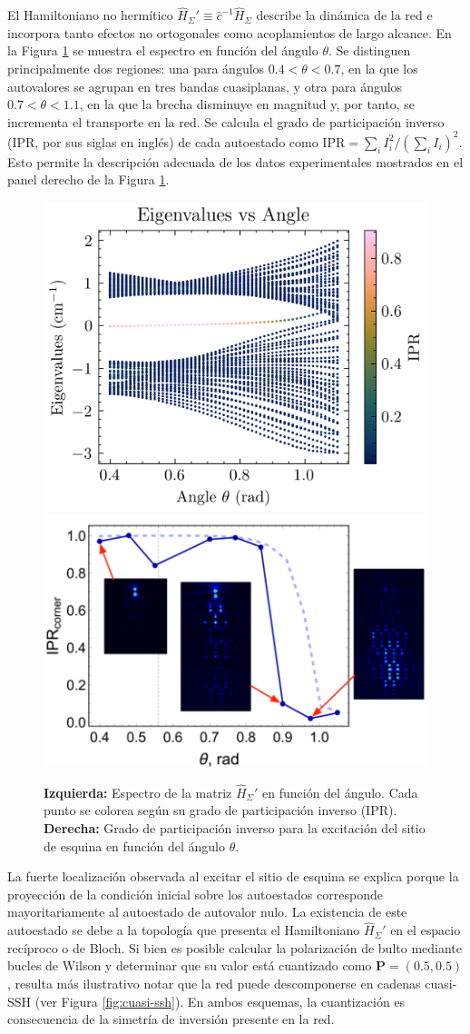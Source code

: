 El Hamiltoniano no hermítico $\hat{H}_\Sigma' \equiv \hat{c}^{-1} \hat{H}_\Sigma$ describe la dinámica de la red e incorpora tanto efectos no ortogonales como acoplamientos de largo alcance. En la Figura \ref{fig:honeycomb-spectra} se muestra el espectro en función del ángulo $\theta$. Se distinguen principalmente dos regiones: una para ángulos $0.4 < \theta < 0.7$, en la que los autovalores se agrupan en tres bandas cuasiplanas, y otra para ángulos $0.7 < \theta < 1.1$, en la que la brecha disminuye en magnitud y, por tanto, se incrementa el transporte en la red. Se calcula el grado de participación inverso (IPR, por sus siglas en inglés) de cada autoestado como $\text{IPR} = \sum_i I_i^2/(\sum_i I_i)^2$. Esto permite la descripción adecuada de los datos experimentales mostrados en el panel derecho de la Figura \ref{fig:honeycomb-spectra}.
\begin{figure}[H]
	\centering
	\includegraphics[width=0.45\linewidth]{codigo/honeycomb_eigenvalues_vs_angle.png}
	\includegraphics[width=0.5\linewidth]{media/ipr-corner-exp.png}
	\caption[Espectro de la red de panal de abeja de modos $p_y$ en función del ángulo]{\textbf{Izquierda:} Espectro de la matriz $\hat{H}_\Sigma'$ en función del ángulo. Cada punto se colorea según su grado de participación inverso (IPR). \textbf{Derecha:} Grado de participación inverso para la excitación del sitio de esquina en función del ángulo $\theta$.\label{fig:honeycomb-spectra}}
\end{figure} \vspace{-3ex}
La fuerte localización observada al excitar el sitio de esquina se explica porque la proyección de la condición inicial sobre los autoestados corresponde mayoritariamente al autoestado de autovalor nulo. La existencia de este autoestado se debe a la topología que presenta el Hamiltoniano $\hat{H}_\Sigma'$ en el espacio recíproco o de Bloch. Si bien es posible calcular la polarización de bulto mediante bucles de Wilson y determinar que su valor está cuantizado como $\mathbf{P} = (0.5, 0.5)$, resulta más ilustrativo notar que la red puede descomponerse en cadenas cuasi-SSH (ver Figura \ref{fig:cuasi-ssh}). En ambos esquemas, la cuantización es consecuencia de la simetría de inversión presente en la red. 

